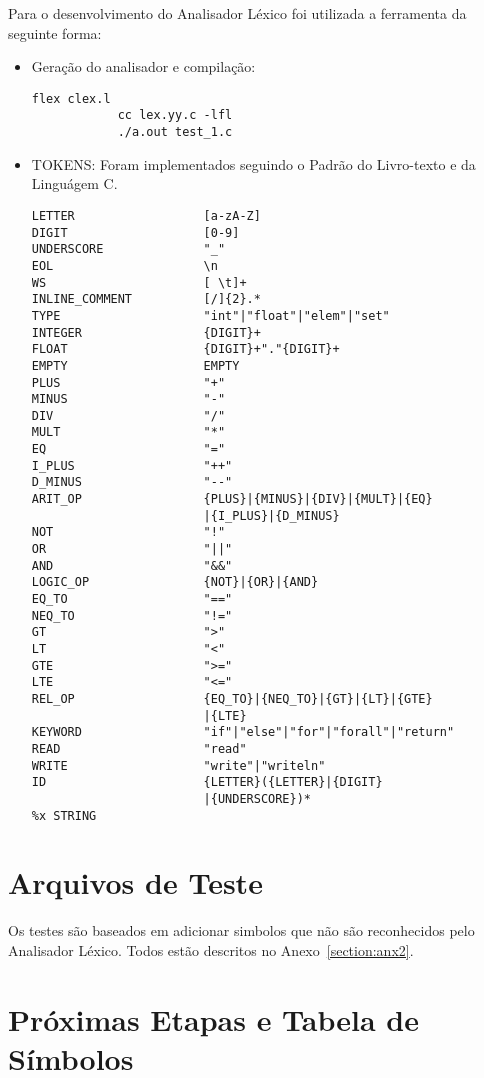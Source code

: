 \documentclass[runningheads]{llncs}
\begin{document}
Para o desenvolvimento do Analisador Léxico foi utilizada a ferramenta \cite{flexbison_book} da seguinte forma:
\begin{itemize}
    \item Geração do analisador e compilação:
        \begin{lstlisting}[style=CStyle]
            flex clex.l
            cc lex.yy.c -lfl
            ./a.out test_1.c\end{lstlisting}
    \item TOKENS: Foram implementados seguindo o Padrão do Livro-texto \cite{compilers_book} e da Linguágem C.
        \begin{lstlisting}[style=CStyle]
LETTER                  [a-zA-Z]
DIGIT                   [0-9]
UNDERSCORE              "_"
EOL                     \n        
WS                      [ \t]+
INLINE_COMMENT          [/]{2}.*
TYPE                    "int"|"float"|"elem"|"set"
INTEGER                 {DIGIT}+
FLOAT                   {DIGIT}+"."{DIGIT}+
EMPTY                   EMPTY
PLUS                    "+"
MINUS                   "-"
DIV                     "/"
MULT                    "*"
EQ                      "="
I_PLUS                  "++"
D_MINUS                 "--"
ARIT_OP                 {PLUS}|{MINUS}|{DIV}|{MULT}|{EQ}
                        |{I_PLUS}|{D_MINUS}
NOT                     "!"
OR                      "||"
AND                     "&&"
LOGIC_OP                {NOT}|{OR}|{AND}
EQ_TO                   "=="
NEQ_TO                  "!="
GT                      ">"
LT                      "<"
GTE                     ">="
LTE                     "<="
REL_OP                  {EQ_TO}|{NEQ_TO}|{GT}|{LT}|{GTE}
                        |{LTE}
KEYWORD                 "if"|"else"|"for"|"forall"|"return"
READ                    "read"
WRITE                   "write"|"writeln"
ID                      {LETTER}({LETTER}|{DIGIT}
                        |{UNDERSCORE})*
%x STRING
\end{lstlisting}
\end{itemize}

\section{Arquivos de Teste}
Os testes são baseados em adicionar simbolos que não são reconhecidos pelo Analisador Léxico. Todos estão descritos no Anexo~\ref{section:anx2}.

\section{Próximas Etapas e Tabela de Símbolos}
\end{document}
